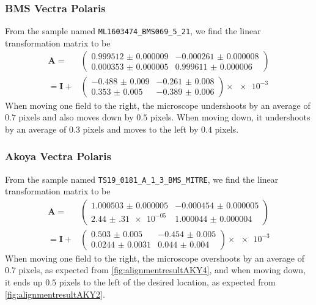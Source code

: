 \documentclass{article}
\newcommand{\matrixbold}[1]{\mathbf{#1}}
\begin{document}
\subsubsection{BMS Vectra Polaris}

From the sample named \texttt{ML1603474\_BMS069\_5\_21}, we find the linear transformation matrix to be
\begin{align}
\matrixbold{A}=&\begin{pmatrix}
\num{0.999512(9)} &
\num{-0.000261(8)} \\
\num{0.000353(5)} &
\num{0.999611(6)}
\end{pmatrix} \\
=\matrixbold{I} + &\begin{pmatrix}
\num{-0.488(9)} &
\num{-0.261(8)} \\
\num{0.353(5)} &
\num{-0.389(6)}
\end{pmatrix} \times \num{e-3}
\label{eq:Amatrix_ML1603474_BMS069_5_21}
\end{align}
When moving one field to the right, the microscope undershoots by an average of $0.7$ pixels and also moves down by $0.5$ pixels.  When moving down, it undershoots by an average of $0.3$ pixels and moves to the left by $0.4$ pixels.

\subsubsection{Akoya Vectra Polaris}

From the sample named \texttt{TS19\_0181\_A\_1\_3\_BMS\_MITRE}, we find the linear transformation matrix to be
\begin{align}
\matrixbold{A}=&\begin{pmatrix}
\num{1.000503(5)} &
\num{-0.000454(5)} \\ 
\num{2.44(31)e-05} &
\num{1.000044(4)}
\end{pmatrix} \\
=\matrixbold{I} + &\begin{pmatrix}
\num{0.503(5)} &
\num{-0.454(5)} \\
\num{0.0244(31)} &
\num{0.044(4)}
\end{pmatrix} \times \num{e-3}
\label{eq:Amatrix_TS18_0541_BMS_MITRE}
\end{align}
When moving one field to the right, the microscope overshoots by an average of $0.7$ pixels, as expected from \cref{fig:alignmentresultAKY4}, and when moving down, it ends up $0.5$ pixels to the left of the desired location, as expected from \cref{fig:alignmentresultAKY2}.
\end{document}
